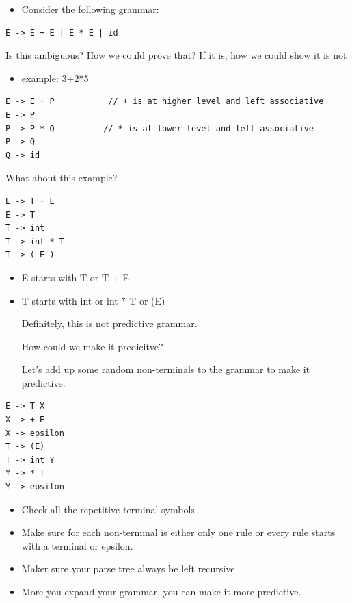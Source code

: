 \documentclass[11pt]{article}
\begin{document}
\begin{itemize}
\item Consider the following grammar:
\end{itemize}

\begin{verbatim}
E -> E + E | E * E | id
\end{verbatim}

Is this ambiguous? How we could prove that? If it is, how we could show it is
not

\begin{itemize}
\item example: 3+2*5
\end{itemize}


\begin{verbatim}
E -> E + P           // + is at higher level and left associative
E -> P 
P -> P * Q          // * is at lower level and left associative
P -> Q  
Q -> id
\end{verbatim}


What about this example?


\begin{verbatim}
E -> T + E
E -> T
T -> int
T -> int * T
T -> ( E )
\end{verbatim}

\begin{itemize}
\item E starts with T or T + E
\item T starts with int or int * T or (E)

Definitely, this is not predictive grammar.

How could we make it predicitve?

Let's add up some random non-terminals to the grammar to make it predictive.
\end{itemize}

\begin{verbatim}
E -> T X
X -> + E 
X -> epsilon
T -> (E)
T -> int Y
Y -> * T
Y -> epsilon
\end{verbatim}

\begin{itemize}
\item Check all the repetitive terminal symbols
\item Make sure for each non-terminal is either only one rule or every rule starts
with a terminal or epsilon.
\item Maker sure your parse tree always be left recursive.
\item More you expand your grammar, you can make it more predictive.
\end{itemize}
\end{document}

